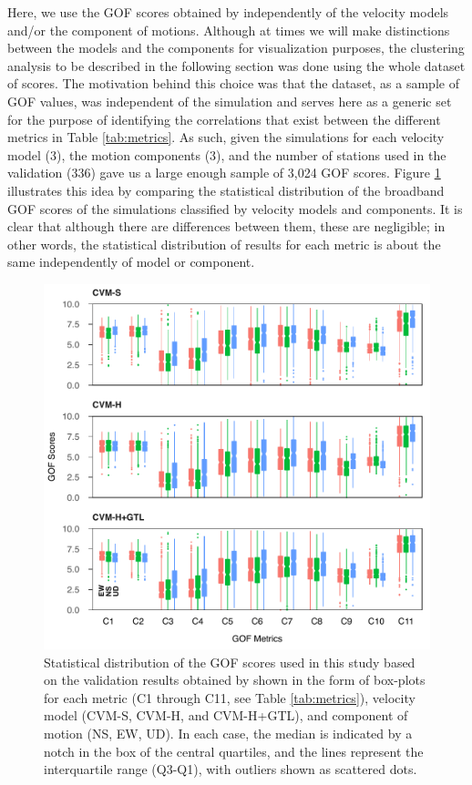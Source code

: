 Here, we use the GOF scores obtained by \citet{Taborda_2014_BSSA} independently of the velocity models and/or the component of motions. Although at times we will make distinctions between the models and the components for visualization purposes, the clustering analysis to be described in the following section was done using the whole dataset of scores. The motivation behind this choice was that the dataset, as a sample of GOF values, was independent of the simulation and serves here as a generic set for the purpose of identifying the correlations that exist between the different metrics in Table \ref{tab:metrics}. As such, given the simulations for each velocity model (3), the motion components (3), and the number of stations used in the validation (336) gave us a large enough sample of 3,024 GOF scores. Figure \ref{fig:data-box-plot} illustrates this idea by comparing the statistical distribution of the broadband GOF scores of the simulations classified by velocity models and components. It is clear that although there are differences between them, these are negligible; in other words, the statistical distribution of results for each metric is about the same independently of model or component.

\begin{figure}
    \centering
    \includegraphics[width=\columnwidth]{figures/pdf/figure-03}
    \caption{Statistical distribution of the GOF scores used in this study based on the validation results obtained by \citet{Taborda_2014_BSSA} shown in the form of box-plots for each metric (C1 through C11, see Table \ref{tab:metrics}), velocity model (CVM-S, CVM-H, and CVM-H+GTL), and component of motion (NS, EW, UD). In each case, the median is indicated by a notch in the box of the central quartiles, and the lines represent the interquartile range (Q3-Q1), with outliers shown as scattered dots.}
    \label{fig:data-box-plot}
\end{figure}

